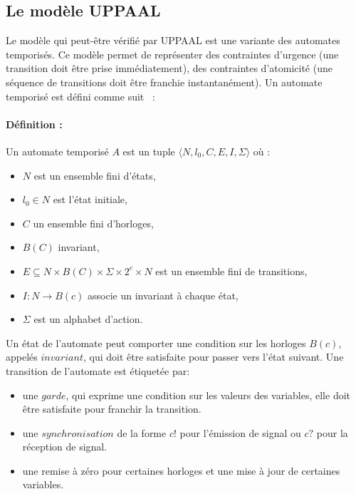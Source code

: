 \documentclass[10pt,a4paper]{article}
\begin{document}
\subsection{Le modèle UPPAAL}
Le modèle qui peut-\^{e}tre vérifié par UPPAAL est une variante des automates temporisés. Ce modèle permet de représenter des contraintes d'urgence (une transition doit \^{e}tre prise immédiatement), des contraintes d'atomicité (une séquence de transitions doit \^{e}tre franchie instantanément). Un automate temporisé est défini comme suit~\cite{ref5} :
\paragraph{Définition :}
Un automate temporisé $A$ est un tuple $\langle N, l_{0}, C, E, I, \Sigma \rangle$ o\`{u} :
\begin{itemize}
\item $N$ est un ensemble fini d'états,
\item $l_{0} \in N$ est l'état initiale,
\item $C$ un ensemble fini d'horloges,
\item $B(C)$ invariant, 
\item $E \subseteq N \times B(C) \times \Sigma \times 2^c \times N$ est un ensemble fini de transitions, 
\item $I : N \longrightarrow B(c)$ associe un invariant à chaque état,
\item $\Sigma$ est un alphabet d'action.\newline
\end{itemize}

Un état de l'automate peut comporter une condition sur les horloges $B(c)$, appelés $invariant$, qui doit \^{e}tre satisfaite pour passer vers l'état suivant. Une transition de l'automate est étiquetée par:
\begin{itemize}
\item une $garde$, qui exprime une condition sur les valeurs des variables, elle doit \^{e}tre satisfaite pour franchir la transition.
\item une $synchronisation$ de la forme $c!$ pour l'émission de signal ou $c?$ pour la réception de signal.
\item une remise à zéro pour certaines horloges et une mise à jour de certaines variables.
\end{itemize}
\end{document}
